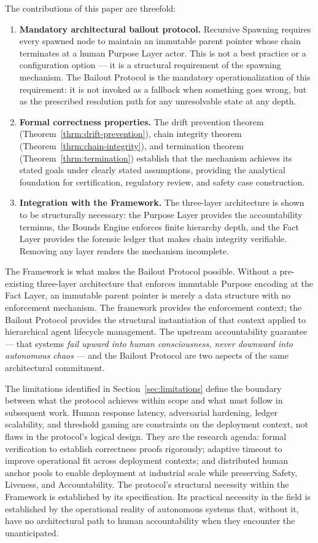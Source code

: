 The contributions of this paper are threefold:

\begin{enumerate}
    \itemsep0em
    \item \textbf{Mandatory architectural bailout protocol.} Recursive Spawning requires every spawned node to maintain an immutable parent pointer whose chain terminates at a human Purpose Layer actor. This is not a best practice or a configuration option — it is a structural requirement of the spawning mechanism. The Bailout Protocol is the mandatory operationalization of this requirement: it is not invoked as a fallback when something goes wrong, but as the prescribed resolution path for any unresolvable state at any depth.
    \item \textbf{Formal correctness properties.} The drift prevention theorem (Theorem~\ref{thrm:drift-prevention}), chain integrity theorem (Theorem~\ref{thrm:chain-integrity}), and termination theorem (Theorem~\ref{thrm:termination}) establish that the mechanism achieves its stated goals under clearly stated assumptions, providing the analytical foundation for certification, regulatory review, and safety case construction.
    \item \textbf{Integration with the \bxthree{} Framework.} The three-layer architecture is shown to be structurally necessary: the Purpose Layer provides the accountability terminus, the Bounds Engine enforces finite hierarchy depth, and the Fact Layer provides the forensic ledger that makes chain integrity verifiable. Removing any layer renders the mechanism incomplete.
\end{enumerate}

The \bxthree{} Framework is what makes the Bailout Protocol possible. Without a pre-existing three-layer architecture that enforces immutable Purpose encoding at the Fact Layer, an immutable parent pointer is merely a data structure with no enforcement mechanism. The framework provides the enforcement context; the Bailout Protocol provides the structural instantiation of that context applied to hierarchical agent lifecycle management. The upstream accountability guarantee — that \bxthree{} systems \emph{fail upward into human consciousness, never downward into autonomous chaos} — and the Bailout Protocol are two aspects of the same architectural commitment.

The limitations identified in Section~\ref{sec:limitations} define the boundary between what the protocol achieves within scope and what must follow in subsequent work. Human response latency, adversarial hardening, ledger scalability, and threshold gaming are constraints on the deployment context, not flaws in the protocol's logical design. They are the research agenda: formal verification to establish correctness proofs rigorously; adaptive timeout to improve operational fit across deployment contexts; and distributed human anchor pools to enable deployment at industrial scale while preserving Safety, Liveness, and Accountability. The protocol's structural necessity within the \bxthree{} Framework is established by its specification. Its practical necessity in the field is established by the operational reality of autonomous systems that, without it, have no architectural path to human accountability when they encounter the unanticipated.
